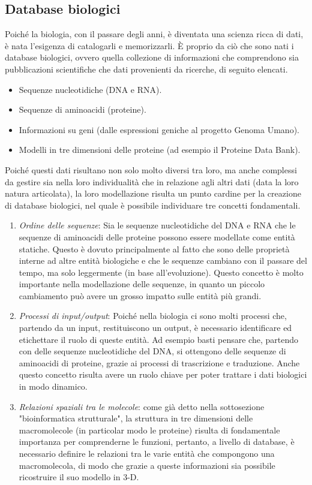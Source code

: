 \subsection{Database biologici}
Poiché la biologia, con il passare degli anni, è diventata una scienza ricca di dati, è nata l'esigenza di catalogarli e memorizzarli. \`E proprio da ciò che sono nati i database biologici, ovvero quella collezione di informazioni che comprendono sia pubblicazioni scientifiche che dati provenienti da ricerche, di seguito elencati.
\begin{itemize}
	\item Sequenze nucleotidiche (DNA e RNA).
	\item Sequenze di aminoacidi (proteine).
	\item Informazioni su geni (dalle espressioni geniche al progetto Genoma Umano).
	\item Modelli in tre dimensioni delle proteine (ad esempio il Proteine Data Bank\cite{proteineDataBank}).
\end{itemize}
Poiché questi dati risultano non solo molto diversi tra loro, ma anche complessi da gestire sia nella loro individualità che in relazione agli altri dati (data la loro natura articolata), la loro modellazione risulta un punto cardine per la creazione di database biologici, nel quale è possibile individuare tre concetti fondamentali.
\begin{enumerate}
	\item \textit{Ordine delle sequenze}: Sia le sequenze nucleotidiche del DNA e RNA che le sequenze di aminoacidi delle proteine possono essere modellate come entità statiche. Questo è dovuto principalmente al fatto che sono delle proprietà interne ad altre entità biologiche e che le sequenze cambiano con il passare del tempo, ma solo leggermente (in base all'evoluzione).
	\newline
	Questo concetto è molto importante nella modellazione delle sequenze, in quanto un piccolo cambiamento può avere un grosso impatto sulle entità più grandi.
	\item \textit{Processi di input/output}: Poiché nella biologia ci sono molti processi che, partendo da un input, restituiscono un output, è necessario identificare ed etichettare il ruolo di queste entità. Ad esempio basti pensare che, partendo con delle sequenze nucleotidiche del DNA, si ottengono delle sequenze di aminoacidi di proteine, grazie ai processi di trascrizione e traduzione.
	\newline
	Anche questo concetto risulta avere un ruolo chiave per poter trattare i dati biologici in modo dinamico.
	\item \textit{Relazioni spaziali tra le molecole}: come già detto nella sottosezione "bioinformatica strutturale", la struttura in tre dimensioni delle macromolecole (in particolar modo le proteine) risulta di fondamentale importanza per comprenderne le funzioni, pertanto, a livello di database, è necessario definire le relazioni tra le varie entità che compongono una macromolecola, di modo che grazie a queste informazioni sia possibile ricostruire il suo modello in 3-D.
\end{enumerate}
